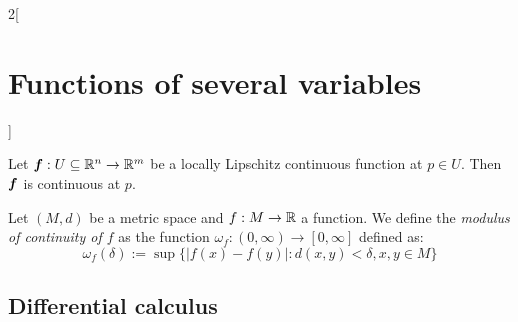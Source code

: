 \documentclass[../../../main.tex]{subfiles}
\begin{document}
\begin{multicols}{2}[\section{Functions of several variables}]
  \begin{prop}
    Let $\mathbf{\boldsymbol{f}}:U\subseteq\mathbb{R}^n\rightarrow\mathbb{R}^m$ be a locally Lipschitz continuous function at $p\in U$. Then $\mathbf{\boldsymbol{f}}$ is continuous at $p$.
  \end{prop}
  \begin{definition}
    Let $(M,d)$ be a metric space and $f:M\rightarrow\mathbb{R} $ a function. We define the \textit{modulus of continuity of $f$} as the function $\omega_f:(0,\infty)\rightarrow[0,\infty]$ defined as: $$\omega_f(\delta):=\sup\{|f(x)-f(y)|:d(x,y)<\delta, x,y\in M\}$$
  \end{definition}
  \subsection{Differential calculus}

\end{multicols}
\end{document}
